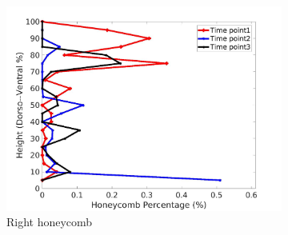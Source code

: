 \begin{figure}[H]
\begin{subfigure}{.4\linewidth}
  \includegraphics[width=\linewidth,trim={{.0\wd0} {.0\wd0} {.0\wd0} {.0\wd0}},clip]{Appendix/Image_AppexA/DorsoToVentral/IPF2RightLungHoneycombDiseaseDorsoToVentral.jpg}
  \caption{Right honeycomb}
  \label{fig:IPF2DiseaseDorsoToVentral-f}
\end{subfigure}
\begin{subfigure}{.4\linewidth}%

\end{subfigure}
\end{figure}
